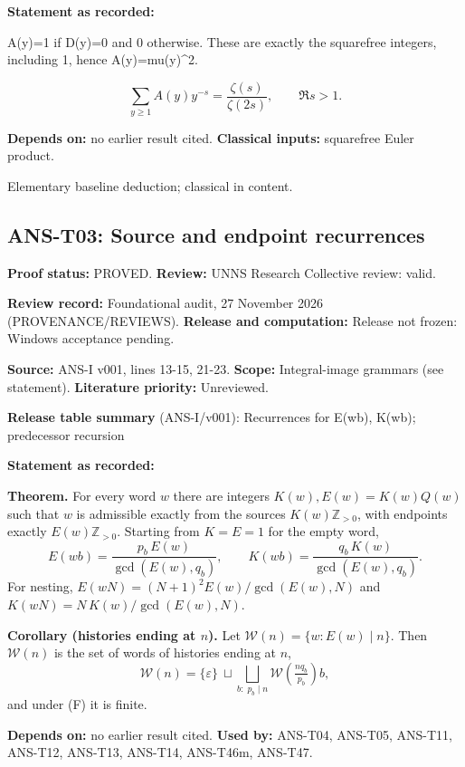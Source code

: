 \documentclass[
  11pt,
]{article}
\begin{document}
\textbf{Statement as recorded:}

A(y)=1 if D(y)=0 and 0 otherwise. These are exactly the squarefree
integers, including 1, hence A(y)=mu(y)\^{}2.

\[\sum_{y\ge1}A(y)y^{-s}=\frac{\zeta(s)}{\zeta(2s)},\qquad \Re s>1.\]

\textbf{Depends on:} no earlier result cited. \textbf{Classical inputs:}
squarefree Euler product.

Elementary baseline deduction; classical in content.

\hypertarget{ans-t03-source-and-endpoint-recurrences}{%
\subsection{ANS-T03: Source and endpoint
recurrences}\label{ans-t03-source-and-endpoint-recurrences}}

\textbf{Proof status:} PROVED. \textbf{Review:} UNNS Research Collective
review: valid.

\textbf{Review record:} Foundational audit, 27 November 2026
(PROVENANCE/REVIEWS). \textbf{Release and computation:} Release not
frozen: Windows acceptance pending.

\textbf{Source:} ANS-I v001, lines 13-15, 21-23. \textbf{Scope:}
Integral-image grammars (see statement). \textbf{Literature priority:}
Unreviewed.

\textbf{Release table summary} (ANS-I/v001): Recurrences for E(wb),
K(wb); predecessor recursion

\textbf{Statement as recorded:}

\textbf{Theorem.} For every word \(w\) there are integers
\(K(w),E(w)=K(w)Q(w)\) such that \(w\) is admissible exactly from the
sources \(K(w)\mathbb Z_{>0}\), with endpoints exactly
\(E(w)\mathbb Z_{>0}\). Starting from \(K=E=1\) for the empty word,
\[E(wb)=\frac{p_b\,E(w)}{\gcd(E(w),q_b)},\qquad K(wb)=\frac{q_b\,K(w)}{\gcd(E(w),q_b)} .\]
For nesting, \(E(wN)=(N+1)^2E(w)/\gcd(E(w),N)\) and
\(K(wN)=N\,K(w)/\gcd(E(w),N)\).

\textbf{Corollary (histories ending at \(n\)).} Let
\(\mathcal W(n)=\{w:E(w)\mid n\}\). Then \(\mathcal W(n)\) is the set of
words of histories ending at \(n\),
\[\mathcal W(n)=\{\varepsilon\}\ \sqcup\bigsqcup_{b:\;p_b\mid n}\mathcal W\!\left(\tfrac{nq_b}{p_b}\right)b,\]
and under (F) it is finite.

\textbf{Depends on:} no earlier result cited. \textbf{Used by:} ANS-T04,
ANS-T05, ANS-T11, ANS-T12, ANS-T13, ANS-T14, ANS-T46m, ANS-T47.
\end{document}
